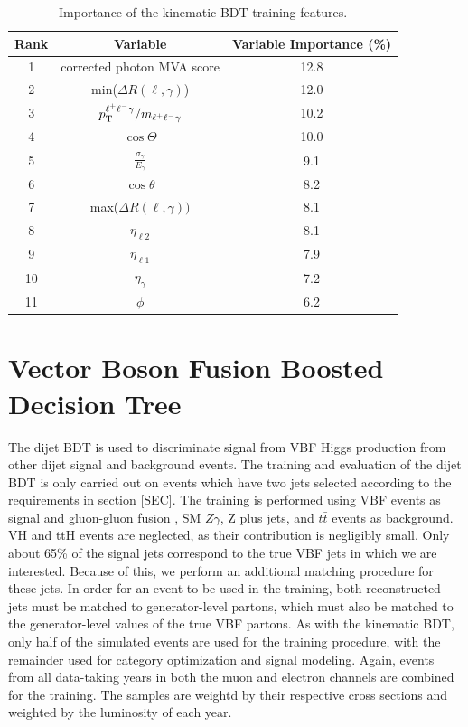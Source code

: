 \begin{table}[tb]
	\centering
	\begin{tabular}{|c|c c|}
		\hline
		Rank &               Variable                & Variable Importance (\%) \\ \hline
		1   & 		corrected photon MVA score 				& 12.8     \\
		2   &        	min($\Delta R(\ell,\gamma)$) 				& 12.0      \\
		3   &       	$p_{\mathrm{T}}^{\ell^{+}\ell^{-}\gamma}/m_{\ell^{+}\ell^{-}\gamma}$ 	 	& 10.2 	  \\
		4   &         	$\cos{\Theta}$	 					& 10.0		 \\
		5   &      	$\frac{\sigma_{\gamma}}{E_\gamma}$     			& 9.1		 \\
		6   &         	$\cos{\theta}$ 						& 8.2      \\
		7   &           max($\Delta R(\ell,\gamma))$ 	              		& 8.1	\\
		8   &  	   	$\eta_{\ell 2}$      					& 8.1      \\
		9   &       	$\eta_{\ell 1}$        					& 7.9 \\
		10  &       	$\eta_\gamma$ 				 		& 7.2      \\
		11  &           $\phi$                    				& 6.2  \\\hline

	\end{tabular}
 \caption{Importance of the kinematic BDT training features.}
\label{tab:kin_importance}
\end{table}

\section{Vector Boson Fusion Boosted Decision Tree}
The dijet BDT is used to discriminate signal from VBF Higgs production from other dijet signal and background events. The training
and evaluation of the dijet BDT is only carried out on events which have two jets selected according to the requirements in 
section [SEC]. The training is performed using VBF \hzg events as signal and gluon-gluon fusion \hzg, SM $Z\gamma$, Z plus jets, and 
$t\bar{t}$ events as background. VH and ttH \hzg events are neglected, as their contribution is negligibly small. Only about 65\% 
of the signal jets correspond to the true VBF jets in which we are interested. Because of this, we perform an additional matching 
procedure for these jets. In order for an event to be used in the training, both reconstructed jets must be matched 
to generator-level partons, which must also be matched to the generator-level \pt values of the true VBF partons. As with the 
kinematic BDT, only half of the simulated events are used for the training procedure, with the remainder used for category optimization
and signal modeling. Again, events from all data-taking years in both the muon and electron channels are combined for the training. 
The samples are weightd by their respective cross sections and weighted by the luminosity of each year. 

